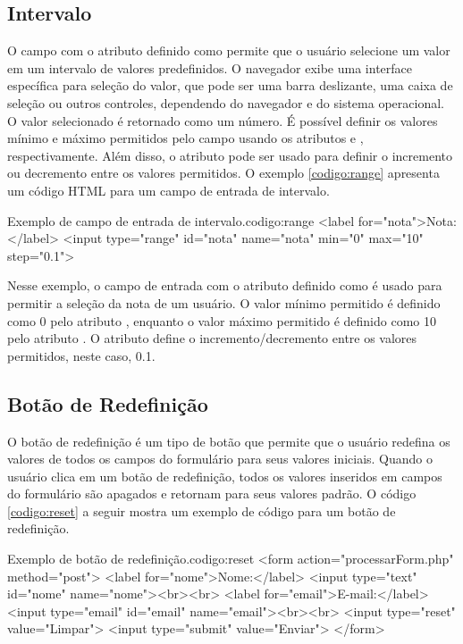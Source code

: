 \subsection{Intervalo}

O campo  com o atributo  definido como  permite que o usuário selecione um valor em um intervalo de valores predefinidos. O navegador exibe uma interface específica para seleção do valor, que pode ser uma barra deslizante, uma caixa de seleção ou outros controles, dependendo do navegador e do sistema operacional. O valor selecionado é retornado como um número. É possível definir os valores mínimo e máximo permitidos pelo campo usando os atributos  e , respectivamente. Além disso, o atributo  pode ser usado para definir o incremento ou decremento entre os valores permitidos. O exemplo \ref{codigo:range} apresenta um código HTML para um campo de entrada de intervalo.

\begin{htmlcode}{Exemplo de campo de entrada de intervalo.}{codigo:range}
<label for="nota">Nota:</label>
<input type="range" id="nota" name="nota" min="0" max="10" step="0.1">
\end{htmlcode}

Nesse exemplo, o campo de entrada  com o atributo  definido como  é usado para permitir a seleção da nota de um usuário. O valor mínimo permitido é definido como 0 pelo atributo , enquanto o valor máximo permitido é definido como 10 pelo atributo . O atributo  define o incremento/decremento entre os valores permitidos, neste caso, 0.1.

\subsection{Botão de Redefinição}

O botão de redefinição é um tipo de botão que permite que o usuário redefina os valores de todos os campos do formulário para seus valores iniciais. Quando o usuário clica em um botão de redefinição, todos os valores inseridos em campos do formulário são apagados e retornam para seus valores padrão. O código \ref{codigo:reset} a seguir mostra um exemplo de código para um botão de redefinição.

\begin{htmlcode}{Exemplo de botão de redefinição.}{codigo:reset}
<form action="processarForm.php" method="post">
   <label for="nome">Nome:</label>
   <input type="text" id="nome" name="nome"><br><br>
   <label for="email">E-mail:</label>
   <input type="email" id="email" name="email"><br><br>
   <input type="reset" value="Limpar">
   <input type="submit" value="Enviar">
</form>
\end{htmlcode}


